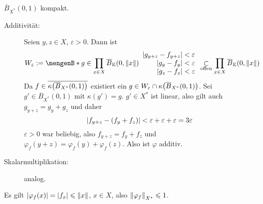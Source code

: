 $\overline{B}_{X^*}(0,1)$ kompakt.
\begin{description}
	\item[Additivität:] Seien $y,z \in X$, $\varepsilon>0$. Dann ist 
	\[
		W_\varepsilon := \set[g \in \prod_{x \in X} \overline{B}_\mathds{K}(0, \norm{x} ) ]{\begin{array}{r}
			\abs*{g_{y+z}- f_{y+z}} < \varepsilon \\ \enspace\abs*{g_y-f_y} < \varepsilon \\ \enspace\abs*{g_z -f_z}  < \varepsilon
		\end{array}  }  
		\underset{\text{offen}}{\subset} \prod_{x \in X} \overline{B}_\mathds{K}(0,\norm{x}) 
	\]
	Da $f \in \overline{\kappa \enbrace*{\overline{B}_{X^*}(0,1)}}$ existiert ein $ g \in W_\varepsilon \cap \kappa \enbrace*{\overline{B}_{X^*}(0,1)}$. Sei 
	$g' \in \overline{B}_{X^*}(0,1)$ mit $\kappa(g')=g$. $g' \in X^*$ ist linear, also gilt auch $g_{y+z}= g_y + g_z$ und daher 
	\[
		\abs*{f_{y+z} - (f_y + f_z)} < \varepsilon + \varepsilon + \varepsilon= 3 \varepsilon
	\]
	$\varepsilon>0$ war beliebig, also $f_{y+z}= f_y+f_z$ und $\varphi_f(y+z)= \varphi_f(y)+ \varphi_f(z)$. Also ist $\varphi$ additiv.
	\item[Skalarmultiplikation:] analog.
\end{description}
Es gilt $\abs*{\varphi_f(x)} = \abs*{f_x} \le \norm{x}$, $x \in X$, also $\norm[X^*]{\varphi_f} \le 1$. \bewende {}

